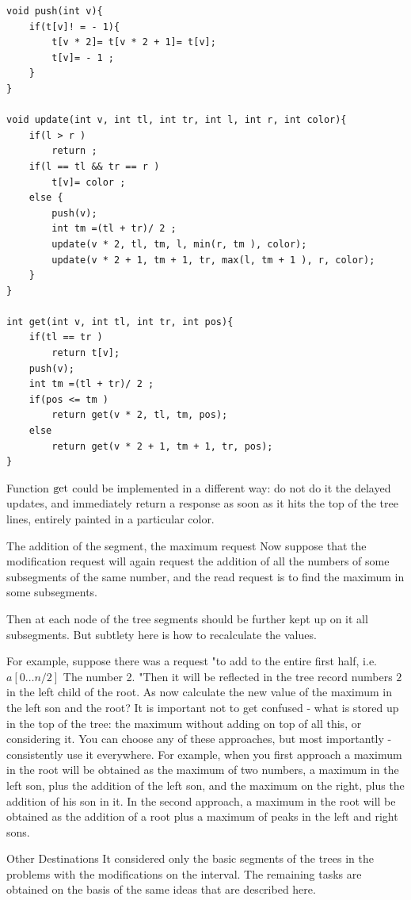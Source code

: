 \begin{verbatim}
void push(int v){
    if(t[v]! = - 1){
        t[v * 2]= t[v * 2 + 1]= t[v];
        t[v]= - 1 ;
    }
}
 
void update(int v, int tl, int tr, int l, int r, int color){
    if(l > r )
        return ;
    if(l == tl && tr == r )
        t[v]= color ;
    else {
        push(v);
        int tm =(tl + tr)/ 2 ;
        update(v * 2, tl, tm, l, min(r, tm ), color);
        update(v * 2 + 1, tm + 1, tr, max(l, tm + 1 ), r, color);
    }
}
 
int get(int v, int tl, int tr, int pos){
    if(tl == tr )
        return t[v];
    push(v);
    int tm =(tl + tr)/ 2 ;
    if(pos <= tm )
        return get(v * 2, tl, tm, pos);
    else
        return get(v * 2 + 1, tm + 1, tr, pos);
} 
\end{verbatim}
Function $\rm get$ could be implemented in a different way: do not do it the delayed updates, and immediately return a response as soon as it hits the top of the tree lines, entirely painted in a particular color.

The addition of the segment, the maximum request
Now suppose that the modification request will again request the addition of all the numbers of some subsegments of the same number, and the read request is to find the maximum in some subsegments.

Then at each node of the tree segments should be further kept up on it all subsegments. But subtlety here is how to recalculate the values.

For example, suppose there was a request "to add to the entire first half, i.e. $a [0 \ldots n / 2]$ The number 2. "Then it will be reflected in the tree record numbers $2$ in the left child of the root. As now calculate the new value of the maximum in the left son and the root? It is important not to get confused - what is stored up in the top of the tree: the maximum without adding on top of all this, or considering it. You can choose any of these approaches, but most importantly - consistently use it everywhere. For example, when you first approach a maximum in the root will be obtained as the maximum of two numbers, a maximum in the left son, plus the addition of the left son, and the maximum on the right, plus the addition of his son in it. In the second approach, a maximum in the root will be obtained as the addition of a root plus a maximum of peaks in the left and right sons.

Other Destinations
It considered only the basic segments of the trees in the problems with the modifications on the interval. The remaining tasks are obtained on the basis of the same ideas that are described here.

